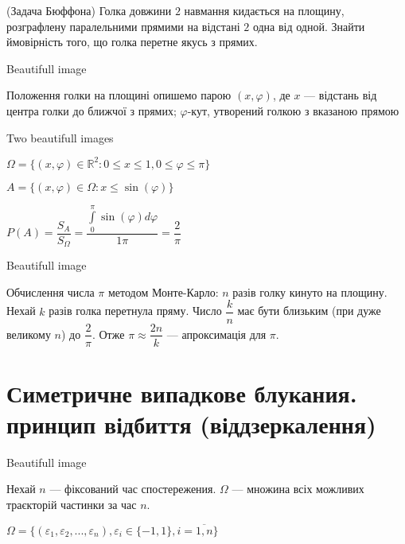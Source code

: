 \begin{example}
    (Задача Бюффона) Голка довжини $2$ навмання кидається на
    площину, розграфлену паралельними прямими на відстані
    $2$ одна від одной. Знайти ймовірність того, що голка
    перетне якусь з прямих.
\end{example}

\begin{solution}
    \begin{center}
        Beautifull image
    \end{center}
    
    Положення голки на площині опишемо парою $(x, \varphi)$, де
    $x$ --- відстань від центра голки до ближчої з прямих;
    $\varphi$-кут, утворений голкою з вказаною прямою

    \begin{center}
        Two beautifull images
    \end{center}

    $\Omega = \{(x, \varphi) \in \mathbb{R}^2: 0 \leqslant x \leqslant 1,
        0 \leqslant \varphi \leqslant \pi \}$

    $A = \{(x, \varphi) \in \Omega: x \leqslant \sin(\varphi)\}$

    $P(A) = \dfrac{S_A}{S_{\Omega}}
    = \dfrac{\int\limits_0^{\pi} \sin(\varphi) d \varphi}{1\pi}
    = \dfrac{2}{\pi}$

    \begin{center}
        Beautifull image
    \end{center}
    
    Обчислення числа $\pi$ методом Монте-Карло: $n$ разів голку
    кинуто на площину. Нехай $k$ разів голка перетнула пряму.
    Число $\dfrac{k}{n}$ має бути близьким (при дуже великому $n$)
    до $\dfrac{2}{\pi}$. Отже $\pi \approx \dfrac{2n}{k}$
    --- апроксимація для $\pi$.
\end{solution}

\chapter{Симетричне випадкове блукания. принцип відбиття (віддзеркалення)}

\begin{center}
    Beautifull image
\end{center}

Нехай $n$ --- фіксований час спостережения.
$\Omega$ --- множина всіх можливих траєкторій
частинки за час $n$.

$\Omega = \{(\varepsilon_1, \varepsilon_2, ..., \varepsilon_n),
    \varepsilon_i \in \{-1, 1\},
    i = \overline{1, n}\}$

